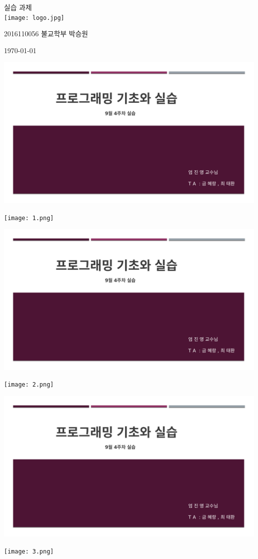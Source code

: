 \documentclass[11pt,a4paper]{article}
\begin{document}
\begin{center}
	 실습 과제\\
	\vspace{2cm}
\hfill\texttt{[image: logo.jpg]}

\hfill\Large 2016110056 불교학부 박승원

\hfill\today
\end{center}

\noindent
\lstset{language=C++, columns=flexible, tabsize=4, frame=shadowbox, showstringspaces=false, breaklines=true, upquote=true, basicstyle=\ttfamily\large}
\begin{enumerate}
\includegraphics[page=3, width=\textwidth]{1.pdf}
	
\texttt{[image: 1.png]}	

\includegraphics[page=4, width=\textwidth]{1.pdf}
	
\texttt{[image: 2.png]}	


\includegraphics[page=5, width=\textwidth]{1.pdf}
	
\texttt{[image: 3.png]}	


\end{enumerate}
\end{document}
